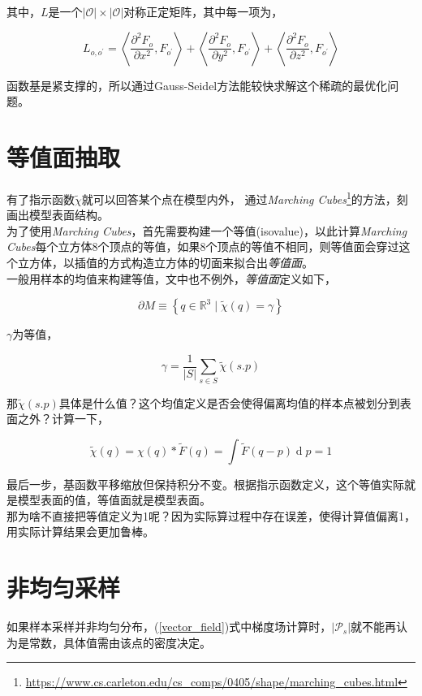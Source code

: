 		其中，$L$是一个$|\mathcal{O}| \times |\mathcal{O}|$对称正定矩阵，其中每一项为，

		$$
			L_{o,o^{\prime}} = \left< \frac{\partial^2 F_o}{\partial x^2}, F_{o^{\prime}}\right>
				+ \left< \frac{\partial^2 F_o}{\partial y^2}, F_{o^{\prime}}\right>
				+ \left< \frac{\partial^2 F_o}{\partial z^2}, F_{o^{\prime}}\right>
		$$

		函数基是紧支撑的，所以通过Gauss-Seidel方法能较快求解这个稀疏的最优化问题。

\section{等值面抽取}
	有了指示函数$\tilde{\chi}$就可以回答某个点在模型内外，	通过\textit{Marching Cubes}\footnote{\url{https://www.cs.carleton.edu/cs_comps/0405/shape/marching_cubes.html}}的方法，刻画出模型表面结构。\\

	为了使用\textit{Marching Cubes}，首先需要构建一个等值(isovalue)，以此计算\textit{Marching Cubes}每个立方体8个顶点的等值，如果8个顶点的等值不相同，则等值面会穿过这个立方体，以插值的方式构造立方体的切面来拟合出\textit{等值面}。\\

	一般用样本的均值来构建等值，文中也不例外，\textit{等值面}定义如下，

	$$
		\partial M \equiv \left\lbrace q \in \mathbb{R}^3 \mid \tilde{\chi}(q) = \gamma\right\rbrace
	$$

	$\gamma$为等值，

	$$
		\gamma = \frac{1}{|S|} \sum_{s \in S}\tilde{\chi}(s.p)
	$$

	那$\tilde{\chi}(s.p)$具体是什么值？这个均值定义是否会使得偏离均值的样本点被划分到表面之外？计算一下，

	$$
		\tilde{\chi}(q) = \chi(q) * \tilde{F}(q) = \int \tilde{F}(q-p)\mathop{d}p = 1
	$$

	最后一步，基函数平移缩放但保持积分不变。根据指示函数定义，这个等值实际就是模型表面的值，等值面就是模型表面。\\

	那为啥不直接把等值定义为1呢？因为实际算过程中存在误差，使得计算值偏离1，用实际计算结果会更加鲁棒。

\section{非均匀采样}
	如果样本采样并非均匀分布，(\ref{vector_field})式中梯度场计算时，$|\mathcal{P}_s|$就不能再认为是常数，具体值需由该点的密度决定。\\

